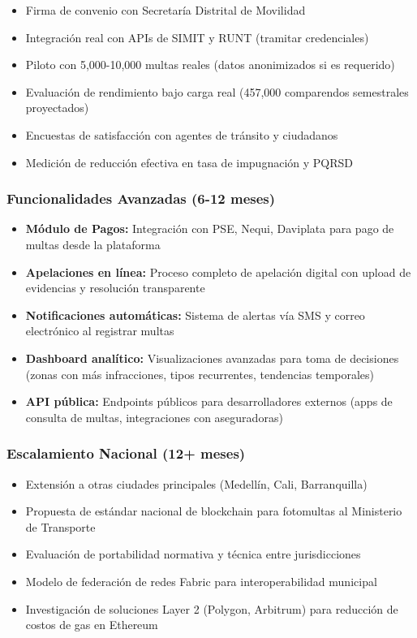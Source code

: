 \begin{itemize}
    \item Firma de convenio con Secretaría Distrital de Movilidad
    \item Integración real con APIs de SIMIT y RUNT (tramitar credenciales)
    \item Piloto con 5,000-10,000 multas reales (datos anonimizados si es requerido)
    \item Evaluación de rendimiento bajo carga real (457,000 comparendos semestrales proyectados)
    \item Encuestas de satisfacción con agentes de tránsito y ciudadanos
    \item Medición de reducción efectiva en tasa de impugnación y PQRSD
\end{itemize}

\subsubsection*{Funcionalidades Avanzadas (6-12 meses)}

\begin{itemize}
    \item \textbf{Módulo de Pagos:} Integración con PSE, Nequi, Daviplata para pago de multas desde la plataforma
    \item \textbf{Apelaciones en línea:} Proceso completo de apelación digital con upload de evidencias y resolución transparente
    \item \textbf{Notificaciones automáticas:} Sistema de alertas vía SMS y correo electrónico al registrar multas
    \item \textbf{Dashboard analítico:} Visualizaciones avanzadas para toma de decisiones (zonas con más infracciones, tipos recurrentes, tendencias temporales)
    \item \textbf{API pública:} Endpoints públicos para desarrolladores externos (apps de consulta de multas, integraciones con aseguradoras)
\end{itemize}

\subsubsection*{Escalamiento Nacional (12+ meses)}

\begin{itemize}
    \item Extensión a otras ciudades principales (Medellín, Cali, Barranquilla)
    \item Propuesta de estándar nacional de blockchain para fotomultas al Ministerio de Transporte
    \item Evaluación de portabilidad normativa y técnica entre jurisdicciones
    \item Modelo de federación de redes Fabric para interoperabilidad municipal
    \item Investigación de soluciones Layer 2 (Polygon, Arbitrum) para reducción de costos de gas en Ethereum
\end{itemize}


